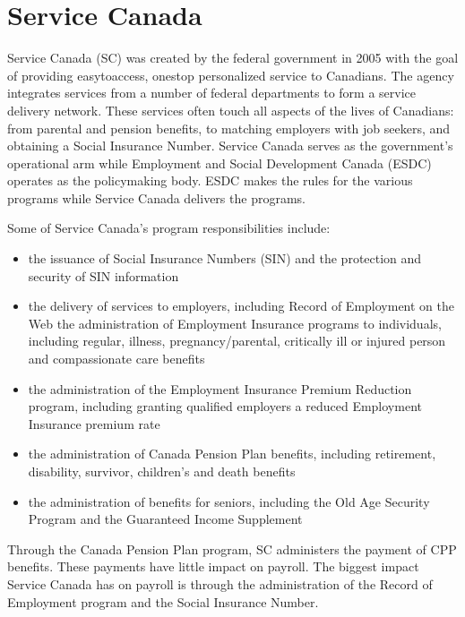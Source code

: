 \documentclass[letterpaper,10pt,english]{sphinxmanual}
\begin{document}
\section{Service Canada}
\label{\detokenize{2_compliance:service-canada}}
\sphinxAtStartPar
Service Canada (SC) was created by the federal government in 2005 with the goal of
providing easy\sphinxhyphen{}to\sphinxhyphen{}access, one\sphinxhyphen{}stop personalized service to Canadians. The agency integrates
services from a number of federal departments to form a service delivery network. These
services often touch all aspects of the lives of Canadians: from parental and pension benefits,
to matching employers with job seekers, and obtaining a Social Insurance Number.
Service Canada serves as the government’s operational arm while Employment and Social
Development Canada (ESDC) operates as the policy\sphinxhyphen{}making body. ESDC makes the rules
for the various programs while Service Canada delivers the programs.

\sphinxAtStartPar
Some of Service Canada’s program responsibilities include:
\begin{itemize}
\item {} 
\sphinxAtStartPar
the issuance of Social Insurance Numbers (SIN) and the protection and security of SIN information

\item {} 
\sphinxAtStartPar
the delivery of services to employers, including Record of Employment on the Web the administration of Employment Insurance programs to individuals, including regular, illness, pregnancy/parental, critically ill or injured person and compassionate care benefits

\item {} 
\sphinxAtStartPar
the administration of the Employment Insurance Premium Reduction program, including granting qualified employers a reduced Employment Insurance premium rate

\item {} 
\sphinxAtStartPar
the administration of Canada Pension Plan benefits, including retirement, disability, survivor, children’s and death benefits

\item {} 
\sphinxAtStartPar
the administration of benefits for seniors, including the Old Age Security Program and the Guaranteed Income Supplement

\end{itemize}

\sphinxAtStartPar
Through the Canada Pension Plan program, SC administers the payment of CPP benefits. These payments have little impact on payroll.
The biggest impact Service Canada has on
payroll is through the administration of the Record of Employment program and the Social
Insurance Number.
\end{document}
